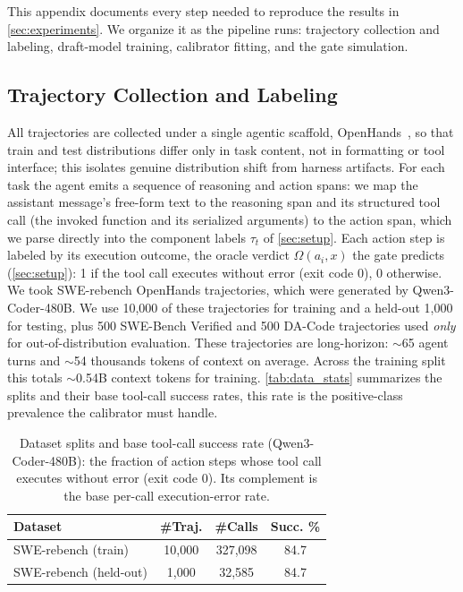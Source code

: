 \documentclass[11pt]{article}
\newcommand{\Hnumber}[1]{#1}
\begin{document}
This appendix documents every step needed to reproduce the results in
\autoref{sec:experiments}. We organize it as the pipeline runs: trajectory collection and
labeling, draft-model training, calibrator fitting, and the gate simulation.

\subsection{Trajectory Collection and Labeling}
All trajectories are collected under a single agentic scaffold, OpenHands~\citep{wang2025openhands}, so that
train and test distributions differ only in task content, not in formatting or tool interface;
this isolates genuine distribution shift from harness artifacts. For each task the agent emits a
sequence of reasoning and action spans: we map the assistant message's free-form
text to the reasoning span and its structured tool call (the invoked function and
its serialized arguments) to the action span, which we parse directly into the component
labels $\tau_t$ of \autoref{sec:setup}. Each action step is labeled by its execution outcome, the
oracle verdict $\Omega(a_i,x)$ the gate predicts (\autoref{sec:setup}): \Hnumber{1} if the tool call
executes without error (exit code \Hnumber{0}), \Hnumber{0} otherwise. We took SWE-rebench OpenHands
trajectories, which were
generated by Qwen3-Coder-480B. We use \Hnumber{10{,}000} of these trajectories for training and a
held-out \Hnumber{1{,}000} for testing, plus \Hnumber{500} SWE-Bench Verified and \Hnumber{500} DA-Code
trajectories used \emph{only} for out-of-distribution evaluation. These trajectories are long-horizon:
\Hnumber{$\sim$65} agent turns and \Hnumber{$\sim$54} thousands tokens of context on average. Across the training split this totals \Hnumber{$\sim$0.54}B context tokens for training.
\autoref{tab:data_stats} summarizes the splits and their base tool-call success rates, this rate is
the positive-class prevalence the calibrator must handle.

\begin{table}[h]
\centering
\caption{Dataset splits and base tool-call success rate (Qwen3-Coder-480B): the fraction of action
steps whose tool call executes without error (exit code \Hnumber{0}). Its complement is the base
per-call execution-error rate.}
\label{tab:data_stats}
\small
\setlength{\tabcolsep}{5pt}
\begin{tabular}{@{}lccc@{}}
\toprule
\textbf{Dataset} & \textbf{\#Traj.} & \textbf{\#Calls} & \textbf{Succ. \%} \\
\midrule
SWE-rebench (train) & \Hnumber{10{,}000} & \Hnumber{327{,}098} & \Hnumber{84.7} \\
SWE-rebench (held-out) & \Hnumber{1{,}000}  & \Hnumber{32{,}585} & \Hnumber{84.7} \\
\bottomrule
\end{tabular}
\end{table}
\end{document}
